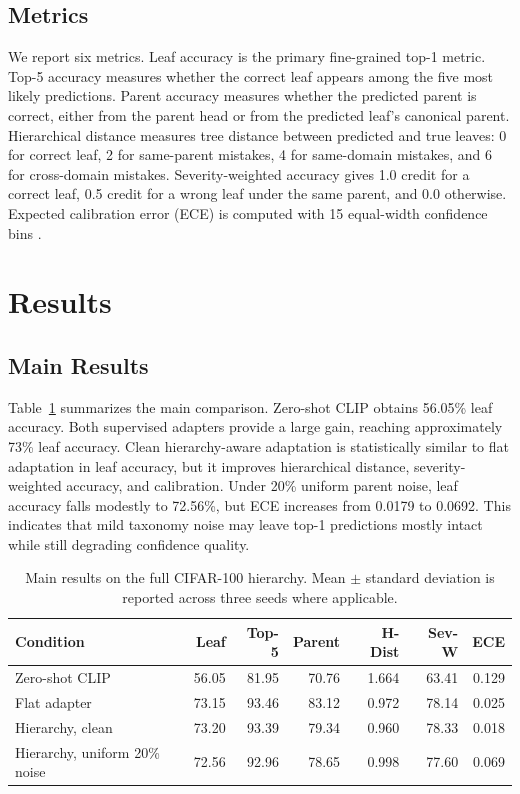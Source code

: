 \documentclass[runningheads]{llncs}
\begin{document}
\subsection{Metrics}
We report six metrics. Leaf accuracy is the primary fine-grained top-1 metric.
Top-5 accuracy measures whether the correct leaf appears among the five most
likely predictions. Parent accuracy measures whether the predicted parent is
correct, either from the parent head or from the predicted leaf's canonical
parent. Hierarchical distance measures tree distance between predicted and
true leaves: 0 for correct leaf, 2 for same-parent mistakes, 4 for same-domain
mistakes, and 6 for cross-domain mistakes. Severity-weighted accuracy gives
1.0 credit for a correct leaf, 0.5 credit for a wrong leaf under the same
parent, and 0.0 otherwise. Expected calibration error (ECE) is computed with
15 equal-width confidence bins \cite{guo2017calibration}.

\section{Results}
\subsection{Main Results}
Table~\ref{tab:main} summarizes the main comparison. Zero-shot CLIP obtains
56.05\% leaf accuracy. Both supervised adapters provide a large gain, reaching
approximately 73\% leaf accuracy. Clean hierarchy-aware adaptation is
statistically similar to flat adaptation in leaf accuracy, but it improves
hierarchical distance, severity-weighted accuracy, and calibration. Under
20\% uniform parent noise, leaf accuracy falls modestly to 72.56\%, but ECE
increases from 0.0179 to 0.0692. This indicates that mild taxonomy noise may
leave top-1 predictions mostly intact while still degrading confidence quality.

\begin{table}
\centering
\caption{Main results on the full CIFAR-100 hierarchy. Mean $\pm$ standard deviation is reported across three seeds where applicable.}
\label{tab:main}
\begin{tabular}{lrrrrrr}
\toprule
Condition & Leaf & Top-5 & Parent & H-Dist & Sev-W & ECE \\
\midrule
Zero-shot CLIP & 56.05 & 81.95 & 70.76 & 1.664 & 63.41 & 0.129 \\
Flat adapter & 73.15 & 93.46 & 83.12 & 0.972 & 78.14 & 0.025 \\
Hierarchy, clean & 73.20 & 93.39 & 79.34 & 0.960 & 78.33 & 0.018 \\
Hierarchy, uniform 20\% noise & 72.56 & 92.96 & 78.65 & 0.998 & 77.60 & 0.069 \\
\bottomrule
\end{tabular}
\end{table}
\end{document}
